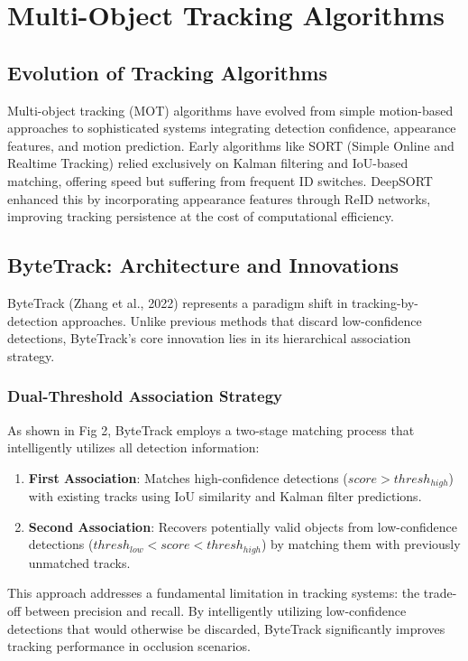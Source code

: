 \documentclass[11pt]{article}
\begin{document}
\section{Multi-Object Tracking Algorithms}

\subsection{Evolution of Tracking Algorithms}
Multi-object tracking (MOT) algorithms have evolved from simple motion-based approaches to sophisticated systems integrating detection confidence, appearance features, and motion prediction. Early algorithms like SORT (Simple Online and Realtime Tracking) relied exclusively on Kalman filtering and IoU-based matching, offering speed but suffering from frequent ID switches. DeepSORT enhanced this by incorporating appearance features through ReID networks, improving tracking persistence at the cost of computational efficiency.

\subsection{ByteTrack: Architecture and Innovations}
ByteTrack (Zhang et al., 2022) represents a paradigm shift in tracking-by-detection approaches. Unlike previous methods that discard low-confidence detections, ByteTrack's core innovation lies in its hierarchical association strategy.

\subsubsection{Dual-Threshold Association Strategy}
As shown in Fig 2, ByteTrack employs a two-stage matching process that intelligently utilizes all detection information:

\begin{enumerate}
    \item \textbf{First Association}: Matches high-confidence detections ($score > thresh_{high}$) with existing tracks using IoU similarity and Kalman filter predictions.
    \item \textbf{Second Association}: Recovers potentially valid objects from low-confidence detections ($thresh_{low} < score < thresh_{high}$) by matching them with previously unmatched tracks.
\end{enumerate}

This approach addresses a fundamental limitation in tracking systems: the trade-off between precision and recall. By intelligently utilizing low-confidence detections that would otherwise be discarded, ByteTrack significantly improves tracking performance in occlusion scenarios.
\end{document}
